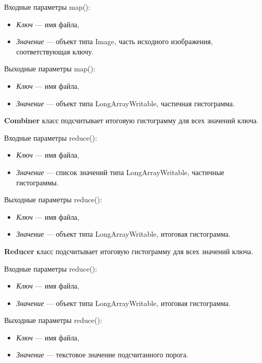 \documentclass[12pt,a4paper]{extarticle} %
\begin{document}
    \noindent Входные параметры map():
    \begin{itemize}
        \item[] \textit{Ключ} --- имя файла,
        \item[] \textit{Значение} --- объект типа Image, часть исходного изображения, соответствующая ключу.
    \end{itemize}

    \noindent Выходные параметры map():
    \begin{itemize}
        \item[] \textit{Ключ} --- имя файла,
        \item[] \textit{Значение} --- объект типа LongArrayWritable, частичная гистограмма.
    \end{itemize}

    \noindent \textbf{Combiner} класс подсчитывает итоговую гистограмму для всех значений ключа. 

    \noindent Входные параметры reduce():
    \begin{itemize}
        \item[] \textit{Ключ} --- имя файла,
        \item[] \textit{Значение} --- список значений типа LongArrayWritable, частичные гистограммы.
    \end{itemize}

    \noindent Выходные параметры reduce():
    \begin{itemize}
        \item[] \textit{Ключ} --- имя файла,
        \item[] \textit{Значение} --- объект типа LongArrayWritable, итоговая гистограмма.
    \end{itemize}

    \noindent \textbf{Reducer} класс подсчитывает итоговую гистограмму для всех значений ключа. 

    \noindent Входные параметры reduce():
    \begin{itemize}
        \item[] \textit{Ключ} --- имя файла,
        \item[] \textit{Значение} --- объект типа LongArrayWritable, итоговая гистограмма.
    \end{itemize}

    \noindent Выходные параметры reduce():
    \begin{itemize}
        \item[] \textit{Ключ} --- имя файла,
        \item[] \textit{Значение} --- текстовое значение подсчитанного порога.
    \end{itemize}
\end{document}
